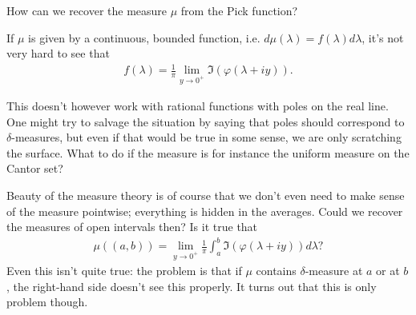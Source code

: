 \begin{quest}
	How can we recover the measure $\mu$ from the Pick function?
\end{quest}

If $\mu$ is given by a continuous, bounded function, i.e. $d \mu(\lambda) = f(\lambda) d \lambda$, it's not very hard to see that
\begin{align*}
	f(\lambda) = \frac{1}{\pi}\lim_{y \to 0^{+}} \Im(\varphi(\lambda + i y)).
\end{align*}

This doesn't however work with rational functions with poles on the real line. One might try to salvage the situation by saying that poles should correspond to $\delta$-measures, but even if that would be true in some sense, we are only scratching the surface. What to do if the measure is for instance the uniform measure on the Cantor set?

Beauty of the measure theory is of course that we don't even need to make sense of the measure pointwise; everything is hidden in the averages. Could we recover the measures of open intervals then? Is it true that
\begin{align*}
	\mu((a, b)) = \lim_{y \to 0^{+}}\frac{1}{\pi}\int_{a}^{b} \Im(\varphi(\lambda + i y)) d \lambda?
\end{align*}
Even this isn't quite true: the problem is that if $\mu$ contains $\delta$-measure at $a$ or at $b$, the right-hand side doesn't see this properly. It turns out that this is only problem though.

